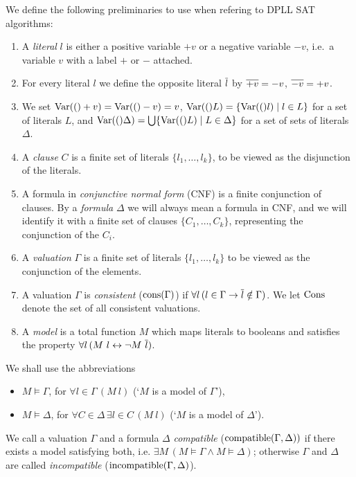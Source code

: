 \begin{mydef}[Preliminaries]
We define the following preliminaries to use when refering to DPLL SAT algorithms:

\begin{enumerate}
\item A \emph{literal} $l$ is either a positive variable $+v$ or a negative variable $-v$, i.e.\ a variable $v$ with a label $+$ or ${-}$ attached.

\item For every literal $l$ we define the opposite literal $\overline{l}$ by $\overline{+v}= -v$, $\overline{-v} = +v$. 

\item We set $\mathrm{Var}(()+v) = \mathrm{Var}(()-v) = v$, $\mathrm{Var}(()L) = \{\mathrm{Var}(()l) \mid l\in L\}$
for a set of literals $L$, and 
$\mathrm{Var}(()\Delta) = \bigcup\{\mathrm{Var}(()L)\mid L\in\Delta\}$ for a set of sets of 
literals $\Delta$.

\item A \emph{clause} $C$ is a finite set of literals 
$\{ l_1, \ldots , l_k \}$, to be viewed as the disjunction of the literals.

\item A formula in \emph{conjunctive normal form} (CNF) is a 
finite conjunction of clauses. 
%
By a \emph{formula} $\Delta$ we will always mean a formula in CNF,
and we will identify it with a finite set of clauses 
$\{ C_1 , \ldots , C_k \}$, representing the conjunction of the $C_i$.

\item A \emph{valuation} $\Gamma$ is a finite set of literals $\{ l_1, \ldots , l_k \}$ to be viewed as the conjunction of the elements.

\item A valuation $\Gamma$ is \emph{consistent} ($\mathrm{cons}(\Gamma)$) if 
%
$\forall l \,( l \in \Gamma \to \overline{l} \notin \Gamma)$.
We let $\mathrm{Cons}$ denote the set of all consistent valuations.


\item A \emph{model} is a total function $M$ which maps literals to booleans and satisfies the property
%
$\forall l \, (M \ l \leftrightarrow \neg M \ \mybar{l})$.
%
\end{enumerate}
%
We shall use the abbreviations 
%
\begin{itemize}
%
\item $M \models \Gamma$, for $\forall l \in \Gamma \, (M \ l)$ 
(`$M$ is a model of $\Gamma$'),
%
\item $M \models \Delta$, for 
$\forall C \in \Delta \, \exists l \in C \,(M \ l)$ 
(`$M$ is a model of $\Delta$').
%
\end{itemize}
%
We call a valuation $\Gamma$ and a formula $\Delta$ \emph{compatible} 
($\mathrm{compatible}(\Gamma,\Delta))$
if there exists a model satisfying both, i.e. 
$\exists M \, (M \models \Gamma \wedge M\models \Delta)$;
otherwise $\Gamma$ and $\Delta$ are called \emph{incompatible} 
($\mathrm{incompatible}(\Gamma,\Delta)$).


\end{mydef}
